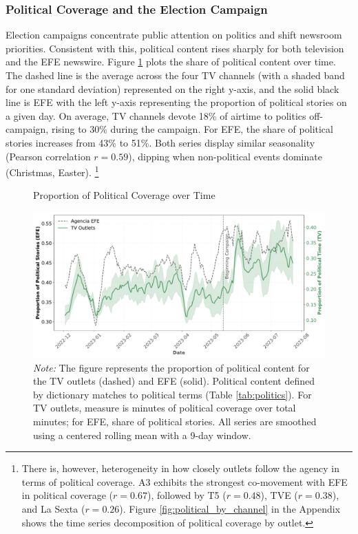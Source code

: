 \documentclass[12pt]{article}
\begin{document}
	
		\subsubsection*{Political Coverage and the Election Campaign}
		
		
	
	
Election campaigns concentrate public attention on politics and shift newsroom priorities. Consistent with this, political content rises sharply for both television and the EFE newswire. Figure \ref{fig:coverage} plots the share of political content over time. The dashed line is the average across the four TV channels (with a shaded band for one standard deviation) represented on the right  y-axis, and the solid black line is  EFE with the left y-axis representing the proportion of political stories on a given day. On average, TV channels devote 18\% of airtime to politics off-campaign, rising to 30\% during the campaign. For EFE, the share of political stories increases from 43\% to 51\%. Both series display similar seasonality (Pearson correlation  $r=0.59$), dipping when non-political events dominate (Christmas, Easter). \footnote{	There is, however, heterogeneity in how closely outlets follow the agency in terms of political coverage. A3 exhibits the strongest co-movement with EFE in political coverage ($r=0.67$), followed by T5 ($r=0.48$), TVE ($r=0.38$), and La Sexta ($r=0.26$). Figure \ref{fig:political_by_channel} in the Appendix shows the time series decomposition of political coverage by outlet.}
	

	
	
		
	\begin{figure}[!htb]
		\caption{Proportion of Political Coverage over Time}
		\centering
				\includegraphics[width=150mm]{figures/political_words_both}
		\caption*{\small \textit{Note:} The figure represents the proportion of political content for the TV outlets (dashed) and  EFE (solid). Political content defined by dictionary matches to political terms (Table \ref{tab:politics}). For TV outlets, measure is minutes of political coverage over total minutes; for EFE, share of political stories. All series are smoothed using a centered rolling mean with a 9-day window.}
		\label{fig:coverage}
	\end{figure}
	
\end{document}
